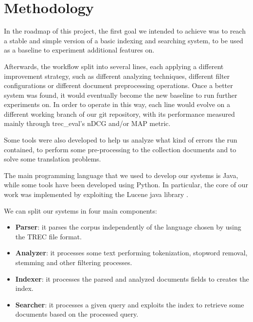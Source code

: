\section{Methodology}
\label{sec:methodology}


In the roadmap of this project, the first goal we intended to achieve was to reach a stable and simple version of a basic indexing and searching system, to be used as a baseline to experiment additional features on. 
\par
Afterwards, the workflow split into several lines, each applying a different improvement strategy, such as different analyzing techniques, different filter configurations or different document preprocessing operations. Once a better system was found, it would eventually become the new baseline to run further experiments on.
In order to operate in this way, each line would evolve on a different working branch of our git repository, with its performance measured mainly through trec\_eval's nDCG and/or MAP metric.
\par
Some tools were also developed to help us analyze what kind of errors the run contained, to perform some pre-processing to the collection documents and to solve some translation problems.
\par
The main programming language that we used to develop our systems is Java, while some tools have been developed using Python. In particular, the core of our work was implemented by exploiting the Lucene java library \cite{lucene}.
\par
We can split our systems in four main components:
\begin{itemize}
	\item \textbf{Parser}: it parses the corpus independently of the language chosen by using the TREC file format.
	\item \textbf{Analyzer}: it processes some text performing tokenization, stopword removal, stemming and other filtering processes.
	\item \textbf{Indexer}: it processes the parsed and analyzed documents fields to creates the index.
	\item \textbf{Searcher}: it processes a given query and exploits the index to retrieve some documents based on the processed query.
\end{itemize}

